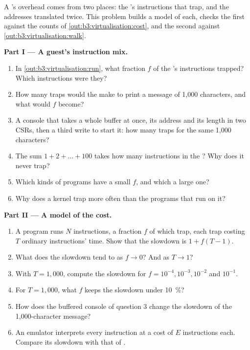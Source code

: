 \begin{problem}\label{pb:b3:virtualisation:1}
A 's overhead comes from two places: the 's instructions that trap, and the addresses translated twice. This problem builds a model of each, checks the first against the counts of \cref{out:b3:virtualisation:cost}, and the second against \cref{out:b3:virtualisation:walk}.

\medskip\noindent\textbf{Part I --- A guest's instruction mix.}
\begin{enumerate}
\item In \cref{out:b3:virtualisation:run}, what fraction $f$ of the 's instructions trapped? Which instructions were they?
\item How many traps would the  make to print a message of 1,000 characters, and what would $f$ become?
\item A console that takes a whole buffer at once, its address and its length in two CSRs, then a third write to start it: how many traps for the same 1,000 characters?
\item The sum $1 + 2 + \dots + 100$ takes how many instructions in the ? Why does it never trap?
\item Which kinds of programs have a small $f$, and which a large one?
\item Why does a  kernel trap more often than the programs that run on it?
\end{enumerate}

\medskip\noindent\textbf{Part II --- A model of the cost.}
\begin{enumerate}[resume]
\item A program runs $N$ instructions, a fraction $f$ of which trap, each trap costing $T$ ordinary instructions' time. Show that the slowdown is $1 + f(T - 1)$.
\item What does the slowdown tend to as $f \to 0$? And as $T \to 1$?
\item With $T = 1{,}000$, compute the slowdown for $f = 10^{-4}, 10^{-3}, 10^{-2}$ and $10^{-1}$.
\item For $T = 1{,}000$, what $f$ keeps the slowdown under 10~\%?
\item How does the buffered console of question 3 change the slowdown of the 1,000-character message?
\item An emulator interprets every instruction at a cost of $E$  instructions each. Compare its slowdown with that of .
\end{enumerate}


\end{problem}
